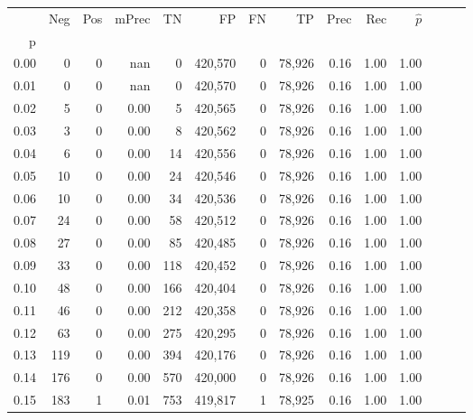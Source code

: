 \begin{tabular}{rrrrrrrrrrrrrr}
\toprule
{} &     Neg &    Pos & mPrec &       TN &       FP &      FN &      TP &  Prec &   Rec & $\hat{p}$ \\
p    &         &        &       &          &          &         &         &       &       &           \\
\midrule
0.00 &       0 &      0 &   nan &        0 &  420,570 &       0 &  78,926 &  0.16 &  1.00 &      1.00 \\
0.01 &       0 &      0 &   nan &        0 &  420,570 &       0 &  78,926 &  0.16 &  1.00 &      1.00 \\
0.02 &       5 &      0 &  0.00 &        5 &  420,565 &       0 &  78,926 &  0.16 &  1.00 &      1.00 \\
0.03 &       3 &      0 &  0.00 &        8 &  420,562 &       0 &  78,926 &  0.16 &  1.00 &      1.00 \\
0.04 &       6 &      0 &  0.00 &       14 &  420,556 &       0 &  78,926 &  0.16 &  1.00 &      1.00 \\
0.05 &      10 &      0 &  0.00 &       24 &  420,546 &       0 &  78,926 &  0.16 &  1.00 &      1.00 \\
0.06 &      10 &      0 &  0.00 &       34 &  420,536 &       0 &  78,926 &  0.16 &  1.00 &      1.00 \\
0.07 &      24 &      0 &  0.00 &       58 &  420,512 &       0 &  78,926 &  0.16 &  1.00 &      1.00 \\
0.08 &      27 &      0 &  0.00 &       85 &  420,485 &       0 &  78,926 &  0.16 &  1.00 &      1.00 \\
0.09 &      33 &      0 &  0.00 &      118 &  420,452 &       0 &  78,926 &  0.16 &  1.00 &      1.00 \\
0.10 &      48 &      0 &  0.00 &      166 &  420,404 &       0 &  78,926 &  0.16 &  1.00 &      1.00 \\
0.11 &      46 &      0 &  0.00 &      212 &  420,358 &       0 &  78,926 &  0.16 &  1.00 &      1.00 \\
0.12 &      63 &      0 &  0.00 &      275 &  420,295 &       0 &  78,926 &  0.16 &  1.00 &      1.00 \\
0.13 &     119 &      0 &  0.00 &      394 &  420,176 &       0 &  78,926 &  0.16 &  1.00 &      1.00 \\
0.14 &     176 &      0 &  0.00 &      570 &  420,000 &       0 &  78,926 &  0.16 &  1.00 &      1.00 \\
0.15 &     183 &      1 &  0.01 &      753 &  419,817 &       1 &  78,925 &  0.16 &  1.00 &      1.00 \\

\end{tabular}
